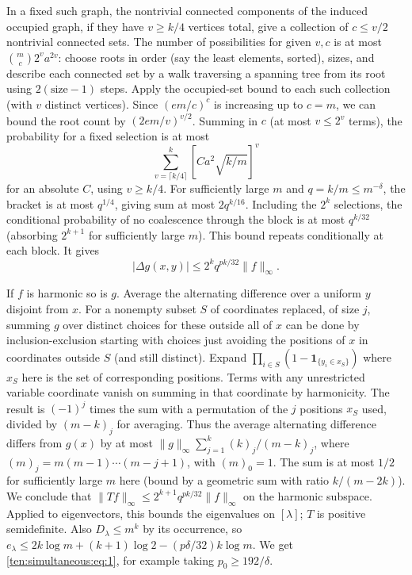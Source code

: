 In a fixed such graph, the nontrivial connected components of the induced occupied graph, if they have \(v\ge k/4\) vertices total, give a collection of \(c\le v/2\) nontrivial connected sets. The number of possibilities for given \(v,c\) is at most \(\binom mc 2^v a^{2v}\): choose roots in order (say the least elements, sorted), sizes, and describe each connected set by a walk traversing a spanning tree from its root using \(2(\text{size}-1)\) steps. Apply the occupied-set bound to each such collection (with \(v\) distinct vertices). Since \((em/c)^c\) is increasing up to \(c=m\), we can bound the root count by \((2em/v)^{v/2}\). Summing in \(c\) (at most \(v\le 2^v\) terms), the probability for a fixed selection is at most
\[
 \sum_{v=\lceil k/4\rceil}^{k} [C a^2\sqrt{k/m}]^v
\]
for an absolute \(C\), using \(v\ge k/4\). For sufficiently large \(m\) and \(q=k/m\le m^{-\delta}\), the bracket is at most \(q^{1/4}\), giving sum at most \(2q^{k/16}\). Including the \(2^k\) selections, the conditional probability of no coalescence through the block is at most \(q^{k/32}\) (absorbing \(2^{k+1}\) for sufficiently large \(m\)). This bound repeats conditionally at each block. It gives
\[
 |\Delta g(x,y)|\le 2^k q^{pk/32}\|f\|_\infty .
\]

If \(f\) is harmonic so is \(g\). Average the alternating difference over a uniform \(y\) disjoint from \(x\). For a nonempty subset \(S\) of coordinates replaced, of size \(j\), summing \(g\) over distinct choices for these outside all of \(x\) can be done by inclusion-exclusion starting with choices just avoiding the positions of \(x\) in coordinates outside \(S\) (and still distinct). Expand \(\prod_{i\in S}(1-\mathbf 1_{\{y_i\in x_S\}})\) where \(x_S\) here is the set of corresponding positions. Terms with any unrestricted variable coordinate vanish on summing in that coordinate by harmonicity. The result is \((-1)^j\) times the sum with a permutation of the \(j\) positions \(x_S\) used, divided by \((m-k)_j\) for averaging. Thus the average alternating difference differs from \(g(x)\) by at most
\(\|g\|_\infty\sum_{j=1}^k (k)_j/(m-k)_j\), where \((m)_j=m(m-1)\cdots(m-j+1)\), with \((m)_0=1\). The sum is at most \(1/2\) for sufficiently large \(m\) here (bound by a geometric sum with ratio \(k/(m-2k)\)). We conclude that \(\|T f\|_\infty\le 2^{k+1} q^{pk/32}\|f\|_\infty\) on the harmonic subspace. Applied to eigenvectors, this bounds the eigenvalues on \([\lambda]\); \(T\) is positive semidefinite. Also \(D_\lambda\le m^k\) by its occurrence, so \(e_\lambda\le 2k\log m+(k+1)\log 2-(p\delta/32)k\log m\). We get \eqref{ten:simultaneous:eq:1}, for example taking \(p_0\ge 192/\delta\).

